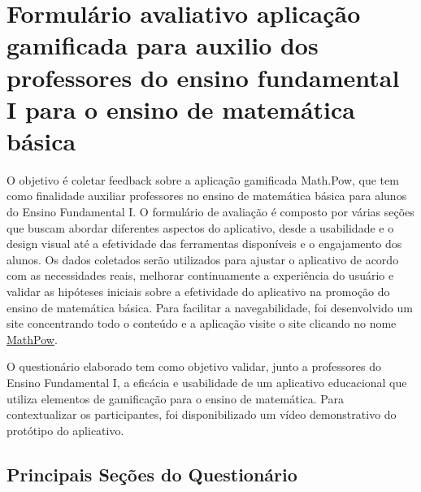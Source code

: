 \section{Formulário avaliativo  aplicação gamificada para auxilio dos professores do ensino fundamental I para o ensino de matemática básica}

O objetivo é coletar feedback sobre a aplicação gamificada Math.Pow, que tem como finalidade auxiliar professores no ensino de matemática básica para alunos do Ensino Fundamental I. O formulário de avaliação é composto por várias seções que buscam abordar diferentes aspectos do aplicativo, desde a usabilidade e o design visual até a efetividade das ferramentas disponíveis e o engajamento dos alunos. Os dados coletados serão utilizados para ajustar o aplicativo de acordo com as necessidades reais, melhorar continuamente a experiência do usuário e validar as hipóteses iniciais sobre a efetividade do aplicativo na promoção do ensino de matemática básica. Para facilitar a navegabilidade, foi desenvolvido um site concentrando todo o conteúdo e a aplicação visite o site clicando no nome \href{https://mathpow.vercel.app/}{MathPow}.

O questionário elaborado tem como objetivo validar, junto a professores do Ensino Fundamental I, a eficácia e usabilidade de um aplicativo educacional que utiliza elementos de gamificação para o ensino de matemática. Para contextualizar os participantes, foi disponibilizado um vídeo demonstrativo do protótipo do aplicativo.

\subsection*{Principais Seções do Questionário}


